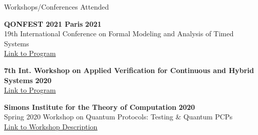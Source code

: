 \documentclass{resume} %
\begin{document}
\begin{rSection}{Workshops/Conferences Attended}

{\bf QONFEST 2021 Paris } \hfill {\bf 2021} \\
19th International Conference on Formal Modeling and Analysis of Timed Systems \\
\href{https://qonfest2021.lacl.fr/formats21.php}{Link to Program}

{\bf  7th Int. Workshop on Applied Verification for Continuous and Hybrid Systems} \hfill {\bf 2020} \\
\href{https://cps-vo.org/group/ARCH/archive}{Link to Program}

{\bf Simons Institute for the Theory of Computation} \hfill {\bf 2020} \\
Spring 2020 Workshop on Quantum Protocols: Testing \& Quantum PCPs \\
\href{https://simons.berkeley.edu/workshops/quantum-2020-2}{Link to Workshop Description}
\end{rSection}
\end{document}

